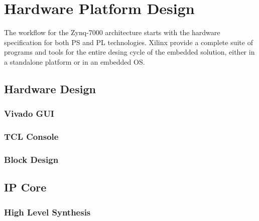 

\chapter{Hardware Platform Design}

The workflow for the Zynq-7000 architecture starts with the hardware specification for both PS and PL technologies. Xilinx provide a complete suite of programs and tools for the entire desing cycle of the embedded solution, either in a standalone platform or in an embedded OS.

\section{Hardware Design}

\subsection{Vivado GUI}

\subsection{TCL Console}

\subsection{Block Design}

\section{IP Core}

\subsection{High Level Synthesis}
